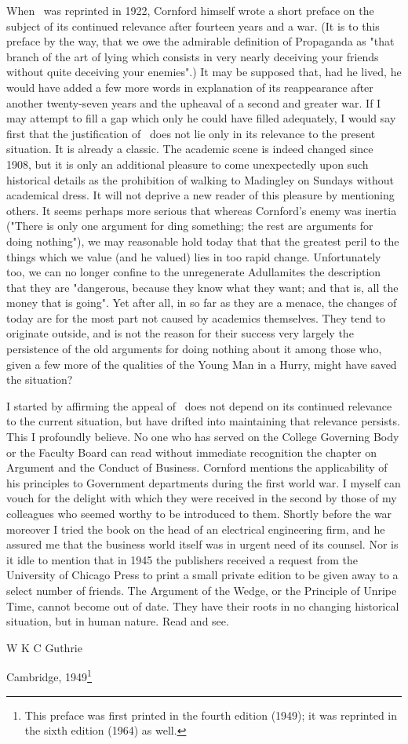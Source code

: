 When \ma\ was reprinted in 1922, Cornford himself wrote a short preface on the subject of its continued relevance after fourteen years and a war. (It is to this preface by the way, that we owe the admirable definition of Propaganda as "that branch of the art of lying which consists in very nearly deceiving your friends without quite deceiving your enemies".) It may be supposed that, had he lived, he would have added a few more words in explanation of its reappearance after another twenty-seven years and the upheaval of a second and greater war. If I may attempt to fill a gap which only he could have filled adequately, I would say first that the justification of \mashort\ does not lie only in its relevance to the present situation. It is al\-ready a classic. The academic scene is indeed changed since 1908, but it is only an additional pleasure to come unexpectedly upon such historical details as the prohibition of walking to Madingley on Sundays without academical dress. It will not deprive a new reader of this pleasure by mentioning others. It seems perhaps more serious that whereas Cornford's enemy was inertia ("There is only one argument for ding something; the rest are arguments for doing nothing"), we may reasonable hold today that that the greatest peril to the things which we value (and he valued) lies in too rapid change. Unfortunately too, we can no longer confine to the unregenerate Adullamites the description that they are "dangerous, because they know what they want; and that is, all the money that is going". Yet after all, in so far as  they are a menace, the changes of today are for the most part not caused by academics themselves. They tend to originate outside, and is not the reason for their success very largely the persistence of the old arguments for doing nothing about it among those who, given a few more of the qualities of the Young Man in a Hurry, might have saved the situation?

I started by affirming the appeal of \mashort\ does not depend on its continued relevance to the current situation, but have drifted into maintaining that relevance persists. This I profoundly believe. No one who has served on the College Governing Body or the Faculty Board can read without immediate recognition the chapter on Argument and the Conduct of Business. Cornford mentions the applicability of his principles to Government departments during the first world war. I myself can vouch for the delight with which they were received in the second by those of my colleagues who seemed worthy to be introduced to them. Shortly before the war moreover I tried the book on the head of an electrical engineering firm, and he assured me that the business world itself was in urgent need of its counsel. Nor is it idle to mention that in 1945 the publishers received a request from the University of Chicago Press to print a small private edition to be given away to a select number of friends. The Argument of the Wedge, or the Principle of Unripe Time, cannot become out of date. They have their roots in no changing historical situation, but in human nature. Read and see.

\begin{flushright}
	W K C Guthrie
\end{flushright}

Cambridge, 1949\footnote{This preface was first printed in the fourth edition (1949); it was reprinted in the sixth edition (1964) as well.}